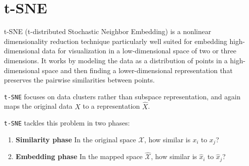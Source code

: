 
\section{t-SNE}
t-SNE (t-distributed Stochastic Neighbor Embedding) is a nonlinear dimensionality reduction technique particularly well suited for embedding high-dimensional data for visualization in a low-dimensional space of two or three dimensions. It works by modeling the data as a distribution of points in a high-dimensional space and then finding a lower-dimensional representation that preserves the pairwise similarities between points.



\texttt{t-SNE} focuses on data clusters rather than subspace representation, and again maps the original data $X$ to a representation $\hat{X}$.

{\texttt{t-SNE} tackles this problem in two phases:\ns
\begin{enumerate}
   \item \textbf{Similarity phase} In the original space $\mathcal{X}$, how similar is $x_i$ to $x_j$?
   
   \item \textbf{Embedding phase} In the mapped space $\hat{\mathcal{X}}$, how similar is $\hat{x}_i$ to $\hat{x}_j$?
\end{enumerate}
}

